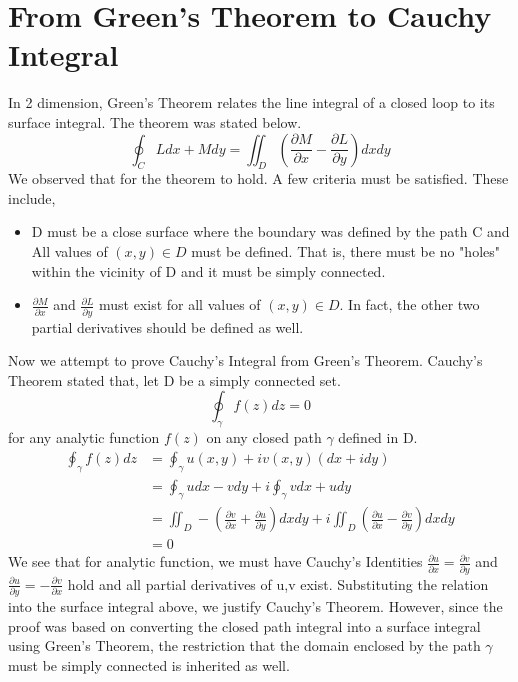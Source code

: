 \documentclass{report}
\begin{document}
\section{From Green's Theorem to Cauchy Integral}
In 2 dimension, Green's Theorem relates the line integral of a closed loop to its surface integral. The theorem was stated below.
\begin{equation*}
\oint_C Ldx + Mdy=\iint_D (\frac{\partial M}{\partial x}-\frac{\partial L}{\partial y})dxdy
\end{equation*}
We observed that for the theorem to hold. A few criteria must be satisfied. These include, 
\begin{itemize}
\item D must be a close surface where the boundary was defined by the path C and All values of $(x,y) \in D$ must be defined. That is, there must be no "holes" within the vicinity of D and it must be simply connected.
\item $\frac{\partial M}{\partial x}$ and $\frac{\partial L}{\partial y}$ must exist for all values of $(x,y) \in D$. In fact, the other two partial derivatives should be defined as well.
\end{itemize}
Now we attempt to prove Cauchy's Integral from Green's Theorem. Cauchy's Theorem stated that, let D be a simply connected set.
\begin{equation*}
\oint_\gamma f(z)dz = 0
\end{equation*}
for any analytic function $f(z)$ on any closed path $\gamma$ defined in D.
\begin{align*}
\oint_\gamma f(z)dz &= \oint_\gamma u(x,y)+iv(x,y) (dx + i dy) \\
&= \oint_\gamma udx-vdy + i\oint_\gamma vdx+udy \\
&= \iint_D -(\frac{\partial v}{\partial x}+\frac{\partial u}{\partial y})dxdy + i\iint_D (\frac{\partial u}{\partial x}-\frac{\partial v}{\partial y})dxdy \\
&= 0
\end{align*}
We see that for analytic function, we must have Cauchy's Identities $\frac{\partial u}{\partial x}=\frac{\partial v}{\partial y}$ and $\frac{\partial u}{\partial y}=-\frac{\partial v}{\partial x}$ hold and all partial derivatives of u,v exist. Substituting the relation into the surface integral above, we justify Cauchy's Theorem. However, since the proof was based on converting the closed path integral into a surface integral using Green's Theorem, the restriction that the domain enclosed by the path $\gamma$ must be simply connected is inherited as well.
\end{document}
